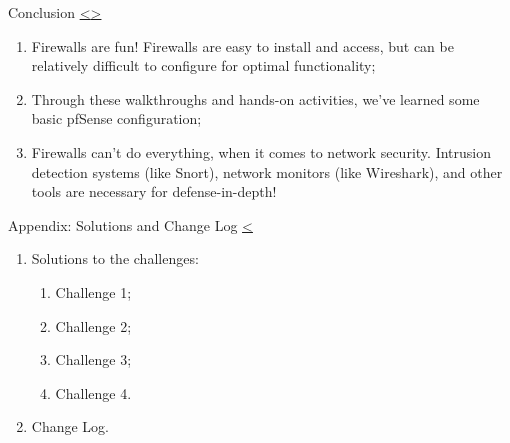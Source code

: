\documentclass[12pt]{extarticle}
\newenvironment{instructionblock}{\Large\bgroup}{\egroup}
\newcommand{\ben}{\begin{enumerate}}
\newcommand{\een}{\end{enumerate}}
\begin{document}
%    
%
%
%






\pagebreak
\begin{slide}{ Conclusion }{ \hyperref[slide 18]{\textless}\hyperref[slide 20]{\textgreater} }
	\begin{instructionblock}
		\begin{enumerate}
			\item Firewalls are fun! Firewalls are easy to install and access, but can be relatively difficult to configure for optimal functionality;
			\item Through these walkthroughs and hands-on activities, we've learned some basic pfSense configuration;
			\item Firewalls can't do everything, when it comes to network security. Intrusion detection systems (like Snort), network monitors (like Wireshark), and other tools are necessary for defense-in-depth!
		\end{enumerate}
	\end{instructionblock}
\end{slide}







\pagebreak	
\begin{slide}{ Appendix: Solutions and Change Log }{ \hyperref[slide 19]{\textless}}
\begin{instructionblock}
	\begin{enumerate}
		\item {Solutions to the challenges:}
    \ben
			\item Challenge 1;
			\item Challenge 2;
			\item Challenge 3;
			\item Challenge 4.
		\een
		\item {Change Log.}
	\end{enumerate}
\end{instructionblock}
\end{slide}
\end{document}
